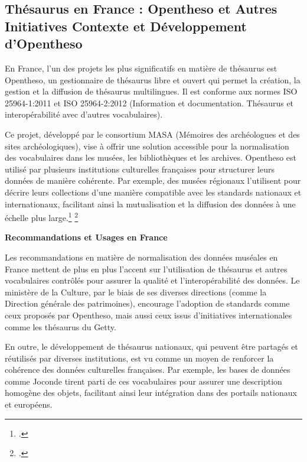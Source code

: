 \subsection{Thésaurus en France : Opentheso et Autres Initiatives Contexte et Développement d'Opentheso}

En France, l'un des projets les plus significatifs en matière de thésaurus est Opentheso, un gestionnaire de thésaurus libre et ouvert qui permet la création, la gestion et la diffusion de thésaurus multilingues. Il est conforme aux normes ISO 25964-1:2011 et ISO 25964-2:2012 (Information et documentation. Thésaurus et interopérabilité avec d’autres vocabulaires).\newline

Ce projet, développé par le consortium MASA (Mémoires des archéologues et des sites archéologiques), vise à offrir une solution accessible pour la normalisation des vocabulaires dans les musées, les bibliothèques et les archives.
Opentheso est utilisé par plusieurs institutions culturelles françaises pour structurer leurs données de manière cohérente. Par exemple, des musées régionaux l'utilisent pour décrire leurs collections d'une manière compatible avec les standards nationaux et internationaux, facilitant ainsi la mutualisation et la diffusion des données à une échelle plus large.\footcite{opentheo_hypo} \footcite{opentheso}\newline

\textbf{Recommandations et Usages en France}\newline

Les recommandations en matière de normalisation des données muséales en France mettent de plus en plus l'accent sur l'utilisation de thésaurus et autres vocabulaires contrôlés pour assurer la qualité et l'interopérabilité des données. Le ministère de la Culture, par le biais de ses diverses directions (comme la Direction générale des patrimoines), encourage l'adoption de standards comme ceux proposés par Opentheso, mais aussi ceux issus d'initiatives internationales comme les thésaurus du Getty. \newline

En outre, le développement de thésaurus nationaux, qui peuvent être partagés et réutilisés par diverses institutions, est vu comme un moyen de renforcer la cohérence des données culturelles françaises. Par exemple, les bases de données comme Joconde tirent parti de ces vocabulaires pour assurer une description homogène des objets, facilitant ainsi leur intégration dans des portails nationaux et européens. \newline

